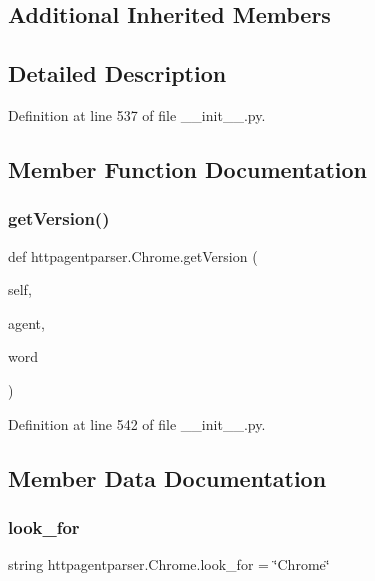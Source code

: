 \subsection*{Additional Inherited Members}


\subsection{Detailed Description}


Definition at line 537 of file \+\_\+\+\_\+init\+\_\+\+\_\+.\+py.



\subsection{Member Function Documentation}
\hypertarget{classhttpagentparser_1_1_chrome_a5a9aba078184a6657a8d60e475e28d2b}{}\label{classhttpagentparser_1_1_chrome_a5a9aba078184a6657a8d60e475e28d2b} 
\subsubsection{\texorpdfstring{get\+Version()}{getVersion()}}
{\footnotesize\ttfamily def httpagentparser.\+Chrome.\+get\+Version (\begin{DoxyParamCaption}\item[{}]{self,  }\item[{}]{agent,  }\item[{}]{word }\end{DoxyParamCaption})}



Definition at line 542 of file \+\_\+\+\_\+init\+\_\+\+\_\+.\+py.



\subsection{Member Data Documentation}
\hypertarget{classhttpagentparser_1_1_chrome_a07cabb02480882dac8e05dcefdbfbd55}{}\label{classhttpagentparser_1_1_chrome_a07cabb02480882dac8e05dcefdbfbd55} 
\subsubsection{\texorpdfstring{look\+\_\+for}{look\_for}}
{\footnotesize\ttfamily string httpagentparser.\+Chrome.\+look\+\_\+for = \char`\"{}Chrome\char`\"{}\hspace{0.3cm}{\ttfamily [static]}}



